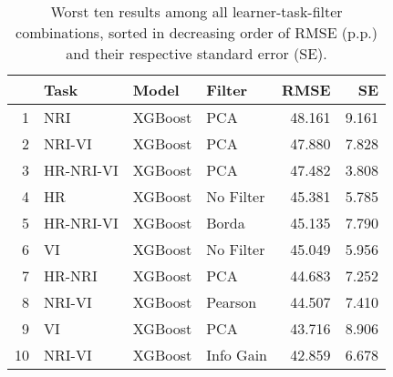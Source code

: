 \begin{table}[ht!]
\centering
\caption{Worst ten results among all learner-task-filter combinations, sorted in decreasing order of RMSE (p.p.) and their respective standard error (SE).} 
\label{tab:perf-worst-10}
\begin{tabular}{rlllrr}
  \hline
 & Task & Model & Filter & RMSE & SE \\ 
  \hline
1 & NRI & XGBoost & PCA & 48.161 & 9.161 \\ 
  2 & NRI-VI & XGBoost & PCA & 47.880 & 7.828 \\ 
  3 & HR-NRI-VI & XGBoost & PCA & 47.482 & 3.808 \\ 
  4 & HR & XGBoost & No Filter & 45.381 & 5.785 \\ 
  5 & HR-NRI-VI & XGBoost & Borda & 45.135 & 7.790 \\ 
  6 & VI & XGBoost & No Filter & 45.049 & 5.956 \\ 
  7 & HR-NRI & XGBoost & PCA & 44.683 & 7.252 \\ 
  8 & NRI-VI & XGBoost & Pearson & 44.507 & 7.410 \\ 
  9 & VI & XGBoost & PCA & 43.716 & 8.906 \\ 
  10 & NRI-VI & XGBoost & Info Gain & 42.859 & 6.678 \\ 
   \hline
\end{tabular}
\end{table}

